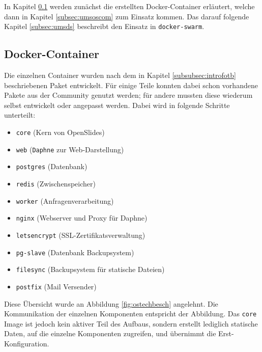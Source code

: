 \documentclass[11pt,a4paper]{article}
\begin{document}
In Kapitel \ref{subsec:umsoscont} werden zunächst die erstellten 
Docker-Container erläutert, welche dann in Kapitel \ref{subsec:umsoscom} zum 
Einsatz kommen. Das darauf folgende Kapitel \ref{subsec:umsds} beschreibt den 
Einsatz in \texttt{docker-swarm}. 
\subsection{Docker-Container}
\label{subsec:umsoscont}
Die einzelnen Container wurden nach dem in Kapitel \ref{subsubsec:introfotb} 
beschriebenen Paket entwickelt. Für einige Teile konnten dabei schon vorhandene 
Pakete aus der Community genutzt werden; für andere mussten diese wiederum 
selbst entwickelt oder angepasst werden. Dabei wird in folgende Schritte 
unterteilt:
\begin{itemize}
	\item \texttt{core} (Kern von OpenSlides)
	\item \texttt{web} (\texttt{Daphne} zur Web-Darstellung)
	\item \texttt{postgres} (Datenbank)
	\item \texttt{redis} (Zwischenspeicher)
	\item \texttt{worker} (Anfragenverarbeitung)
	\item \texttt{nginx} (Webserver und Proxy für Daphne)
	\item \texttt{letsencrypt} (SSL-Zertifikatsverwaltung)
	\item \texttt{pg-slave} (Datenbank Backupsystem)
	\item \texttt{filesync} (Backupsystem für statische Dateien)
	\item \texttt{postfix} (Mail Versender)
\end{itemize}

Diese Übersicht wurde an Abbildung \ref{fig:ostechbesch} angelehnt. Die 
Kommunikation der einzelnen Komponenten entspricht der Abbildung. Das 
\texttt{core} Image ist jedoch kein aktiver Teil des Aufbaus, sondern erstellt 
lediglich statische Daten, auf die einzelne Komponenten zugreifen, und 
übernimmt die Erst-Konfiguration.
\newpage
\end{document}
